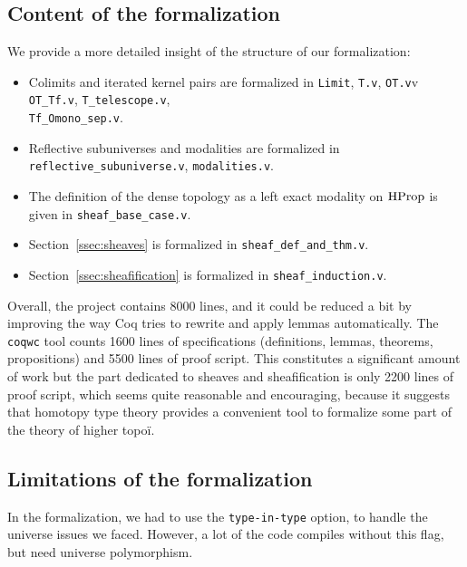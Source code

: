 \subsection{Content of the formalization}
\label{ssec:cont-form}

We provide a more detailed insight of the structure of our formalization:
\begin{itemize} 
\item Colimits and iterated kernel pairs are formalized in
\texttt{Limit}, \texttt{T.v}, \texttt{OT.v}v \texttt{OT\_Tf.v}, \texttt{T\_telescope.v},\\ \texttt{Tf\_Omono\_sep.v}.%
\item
Reflective subuniverses and modalities are formalized in\\
\texttt{reflective\_subuniverse.v}, \texttt{modalities.v}. %
\item 
%
  The definition of the dense topology as a left exact modality on
  $\operatorname{HProp}$ is given in \texttt{sheaf\_base\_case.v}. %
\item
Section~\ref{ssec:sheaves} is formalized in
\texttt{sheaf\_def\_and\_thm.v}. %
\item
Section~\ref{ssec:sheafification} is formalized in
\texttt{sheaf\_induction.v}. %
\end{itemize}

Overall, %
the project
contains 8000 lines, and it could be reduced a bit by improving the
way Coq tries to rewrite and apply lemmas automatically. 
The \texttt{coqwc} tool counts 1600 lines of specifications
(definitions, lemmas, theorems, propositions) and 5500 lines of proof
script.
%
This constitutes a significant amount of work but the part dedicated
to sheaves and sheafification is only 2200 lines of proof script,
which seems quite reasonable and encouraging, because it suggests
that homotopy type theory provides a convenient tool to formalize some
part of the theory of higher topoï. 

\subsection{Limitations of the formalization}
\label{ssec:limit-form}

In the formalization, we had to use the \texttt{type-in-type} option, to handle
the universe issues we faced. However, a lot of the code compiles
without this flag, but need universe polymorphism. 

